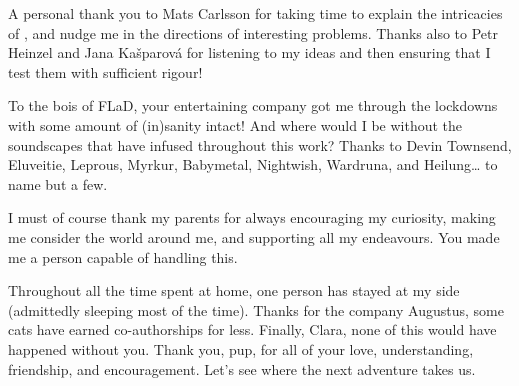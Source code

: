 A personal thank you to Mats Carlsson for taking time to explain the intricacies of \Radyn{}, and nudge me in the directions of interesting problems.
Thanks also to Petr Heinzel and Jana Kašparová for listening to my ideas and then ensuring that I test them with sufficient rigour!

To the bois of FLaD, your entertaining company got me through the lockdowns with some amount of (in)sanity intact!
And where would I be without the soundscapes that have infused throughout this work?
Thanks to Devin Townsend, Eluveitie, Leprous, Myrkur, Babymetal, Nightwish, Wardruna, and Heilung\dots{} to name but a few.

I must of course thank my parents for always encouraging my curiosity, making me consider the world around me, and supporting all my endeavours.
You made me a person capable of handling this.

Throughout all the time spent at home, one person has stayed at my side (admittedly sleeping most of the time).
Thanks for the company Augustus, some cats have earned co-authorships for less.
Finally, Clara, none of this would have happened without you.
Thank you, pup, for all of your love, understanding, friendship, and encouragement.
Let's see where the next adventure takes us.